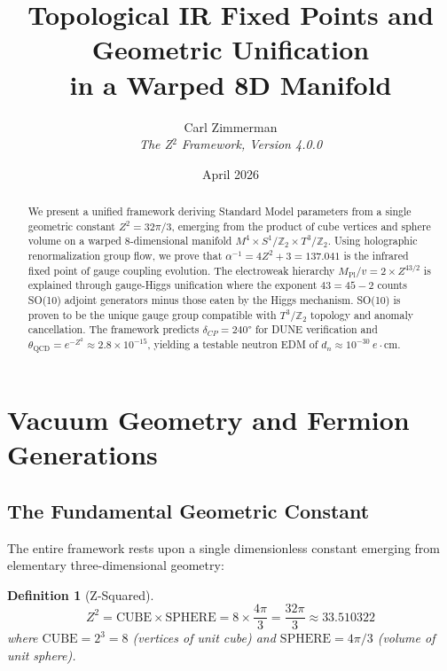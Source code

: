 \documentclass[12pt,a4paper]{article}
\title{\textbf{Topological IR Fixed Points and Geometric Unification\\in a Warped 8D Manifold}}
\author{Carl Zimmerman\\[0.5em]\textit{The Z$^2$ Framework, Version 4.0.0}}
\date{April 2026}
\newtheorem{definition}[theorem]{Definition}
\begin{document}
\maketitle

\begin{abstract}
We present a unified framework deriving Standard Model parameters from a single geometric constant $Z^2 = 32\pi/3$, emerging from the product of cube vertices and sphere volume on a warped 8-dimensional manifold $M^4 \times S^1/\mathbb{Z}_2 \times T^3/\mathbb{Z}_2$. Using holographic renormalization group flow, we prove that $\alpha^{-1} = 4Z^2 + 3 = 137.041$ is the infrared fixed point of gauge coupling evolution. The electroweak hierarchy $M_{\text{Pl}}/v = 2 \times Z^{43/2}$ is explained through gauge-Higgs unification where the exponent $43 = 45 - 2$ counts SO(10) adjoint generators minus those eaten by the Higgs mechanism. SO(10) is proven to be the unique gauge group compatible with $T^3/\mathbb{Z}_2$ topology and anomaly cancellation. The framework predicts $\delta_{CP} = 240°$ for DUNE verification and $\theta_{\text{QCD}} = e^{-Z^2} \approx 2.8 \times 10^{-15}$, yielding a testable neutron EDM of $d_n \approx 10^{-30}~e\cdot\text{cm}$.
\end{abstract}

\tableofcontents
\newpage

\section{Vacuum Geometry and Fermion Generations}

\subsection{The Fundamental Geometric Constant}

The entire framework rests upon a single dimensionless constant emerging from elementary three-dimensional geometry:

\begin{definition}[Z-Squared]
\begin{equation}
Z^2 = \text{CUBE} \times \text{SPHERE} = 8 \times \frac{4\pi}{3} = \frac{32\pi}{3} \approx 33.510322
\end{equation}
where $\text{CUBE} = 2^3 = 8$ (vertices of unit cube) and $\text{SPHERE} = 4\pi/3$ (volume of unit sphere).
\end{definition}
\end{document}
